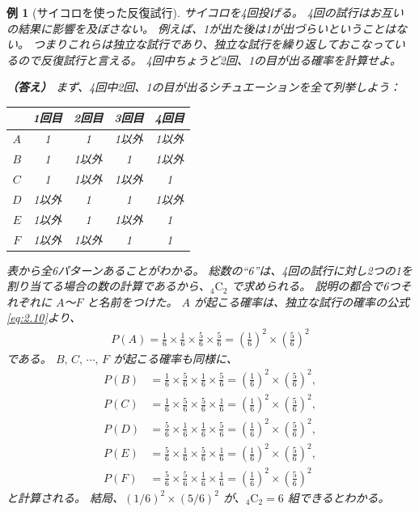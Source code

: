 \documentclass[12pt]{ltjsarticle}\usepackage{ifthen}\newcounter{enlarge}\setcounter{enlarge}{1}
\newtheorem{eg}{例}
\begin{document}
\begin{eg}[サイコロを使った反復試行]
  サイコロを4回投げる。
  4回の試行はお互いの結果に影響を及ぼさない。
  例えば、1が出た後は1が出づらいということはない。
  つまりこれらは独立な試行であり、独立な試行を繰り返しておこなっているので反復試行と言える。
  4回中ちょうど2回、1の目が出る確率を計算せよ。

  \textbf{（答え）}
  まず、4回中2回、1の目が出るシチュエーションを全て列挙しよう：
  
    \begin{center}
      \begin{tabular}{ccccc} \hline
        & 1回目 & 2回目 & 3回目 & 4回目 \\ \hline
        $A$ & {\color{red} 1} & {\color{red} 1} & 1以外 & 1以外 \\
        $B$ & {\color{red} 1} & 1以外 & {\color{red} 1} & 1以外 \\
        $C$ & {\color{red} 1} & 1以外 & 1以外 & {\color{red} 1} \\
        $D$ & 1以外 & {\color{red} 1} & {\color{red} 1} & 1以外 \\
        $E$ & 1以外 & {\color{red} 1} & 1以外 & {\color{red} 1} \\
        $F$ & 1以外 & 1以外 & {\color{red} 1} & {\color{red} 1} \\ \hline
      \end{tabular}
    \end{center}

    表から全6パターンあることがわかる。
    総数の``6''は、4回の試行に対し2つの{\color{red}1}を割り当てる場合の数の計算であるから、${}_4 \mathrm{C}_2$ で求められる。
    説明の都合で6つそれぞれに $A$〜$F$ と名前をつけた。
    $A$ が起こる確率は、独立な試行の確率の公式\eqref{eq:2.10}より、
    \begin{align}
      P(A) = \frac{1}{6} \times \frac{1}{6} \times \frac{5}{6} \times \frac{5}{6} = \left( \frac{1}{6} \right)^2 \times \left( \frac{5}{6} \right)^2
    \end{align}
    である。
    $B,\,C,\, \cdots ,\, F$ が起こる確率も同様に、
    \begin{align}
      P(B) &= \frac{1}{6} \times \frac{5}{6} \times \frac{1}{6} \times \frac{5}{6} = \left( \frac{1}{6} \right)^2 \times \left( \frac{5}{6} \right)^2, \\
      P(C) &= \frac{1}{6} \times \frac{5}{6} \times \frac{5}{6} \times \frac{1}{6} = \left( \frac{1}{6} \right)^2 \times \left( \frac{5}{6} \right)^2, \\
      P(D) &= \frac{5}{6} \times \frac{1}{6} \times \frac{1}{6} \times \frac{5}{6} = \left( \frac{1}{6} \right)^2 \times \left( \frac{5}{6} \right)^2, \\
      P(E) &= \frac{5}{6} \times \frac{1}{6} \times \frac{5}{6} \times \frac{1}{6} = \left( \frac{1}{6} \right)^2 \times \left( \frac{5}{6} \right)^2, \\
      P(F) &= \frac{5}{6} \times \frac{5}{6} \times \frac{1}{6} \times \frac{1}{6} = \left( \frac{1}{6} \right)^2 \times \left( \frac{5}{6} \right)^2
    \end{align}
    と計算される。
    結局、$(1/6)^2 \times (5/6)^2$ が、${}_4 \mathrm{C}_2 = 6$ 組できるとわかる。
    

\end{eg}
\end{document}
